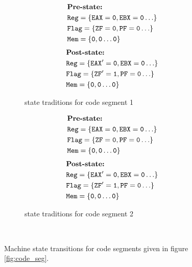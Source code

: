 \begin{figure}[t]
\scriptsize
  \begin{subfigure}[b]{0.4\linewidth}
  \begin{equation*}
\begin{aligned}
    &\text{\textbf{Pre-state:}}\\
    &\mathtt{Reg = \lbrace EAX=0, EBX=0 \ldots \rbrace} \\
    & \mathtt{Flag = \lbrace ZF=0, PF=0 \ldots \rbrace} \\
    & \mathtt{Mem=\lbrace 0,0 \ldots 0 \rbrace}
    \end{aligned}
\end{equation*}
 \begin{equation*}
\begin{aligned}
    &\text{\textbf{Post-state:}}\\
    &\mathtt{Reg = \lbrace EAX^\prime=0, EBX=0 \ldots \rbrace} \\
    & \mathtt{Flag = \lbrace ZF^\prime=1, PF=0 \ldots \rbrace} \\
    & \mathtt{Mem=\lbrace 0,0 \ldots 0 \rbrace}
    \end{aligned}
\end{equation*}
    \label{fig:state_seg1}
       \caption{state traditions for code segment 1}
  \end{subfigure}
  \begin{subfigure}[b]{0.4\linewidth}
    \begin{equation*}
\begin{aligned}
    &\text{\textbf{Pre-state:}}\\
    &\mathtt{Reg = \lbrace EAX=0, EBX=0 \ldots \rbrace} \\
    & \mathtt{Flag = \lbrace ZF=0, PF=0 \ldots \rbrace} \\
    & \mathtt{Mem=\lbrace 0,0 \ldots 0 \rbrace}
    \end{aligned}
\end{equation*}
 \begin{equation*}
\begin{aligned}
    &\text{\textbf{Post-state:}}\\
    &\mathtt{Reg = \lbrace EAX^\prime=0, EBX=0 \ldots \rbrace} \\
    & \mathtt{Flag = \lbrace ZF^\prime=1, PF=0 \ldots \rbrace} \\
    & \mathtt{Mem=\lbrace 0,0 \ldots 0 \rbrace}
    \end{aligned}
\end{equation*}
    \label{fig:state_seg1}
    \caption{state traditions for code segment 2}
  \end{subfigure}
  \\
  \caption{Machine state transitions for code segments given in figure \ref{fig:code_seg}.}
  \label{fig:state_seg}
\end{figure}


